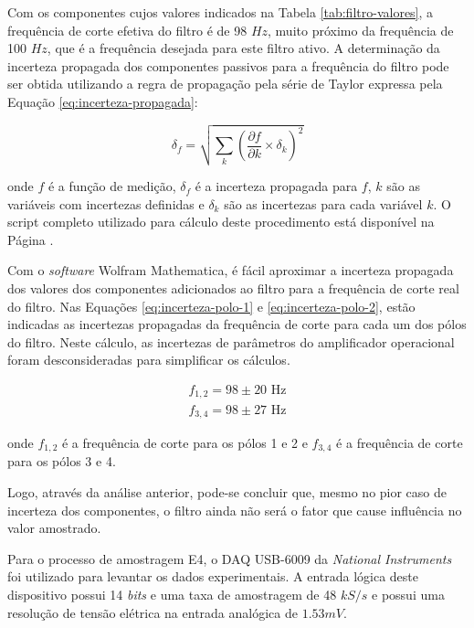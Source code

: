 \documentclass[a4paper]{instrumentacao}
\begin{document}
Com os componentes cujos valores indicados na Tabela \ref{tab:filtro-valores}, a frequência de corte efetiva do filtro é de 98 $Hz$, muito próximo da frequência de 100 $Hz$, que é a frequência desejada para este filtro ativo. A determinação da incerteza propagada dos componentes passivos para a frequência do filtro pode ser obtida utilizando a regra de propagação pela série de Taylor expressa pela Equação \ref{eq:incerteza-propagada}:

\begin{equation}
	\delta_f = \sqrt{
		\sum_{k} 
			\left(\frac{\partial f}{\partial k}\times \delta_k \right)^2
	}
	\label{eq:incerteza-propagada}
\end{equation}

\noindent
onde $f$ é a função de medição, $\delta_f$ é a incerteza propagada para $f$, $k$ são as variáveis com incertezas definidas e $\delta_k$ são as incertezas para cada variável $k$. O script completo utilizado para cálculo deste procedimento está disponível na Página \pageref{att:incerteza-filtro}.

Com o \textit{software} Wolfram Mathematica, é fácil aproximar a incerteza propagada dos valores dos componentes adicionados ao filtro para a frequência de corte real do filtro. Nas Equações \ref{eq:incerteza-polo-1} e \ref{eq:incerteza-polo-2}, estão indicadas as incertezas propagadas da frequência de corte para cada um dos pólos do filtro. Neste cálculo, as incertezas de parâmetros do amplificador operacional foram desconsideradas para simplificar os cálculos.

\begin{eqnarray}
	f_{1,2} = 98 \pm 20 \label{eq:incerteza-polo-1} \text{ Hz} \\
	f_{3,4} = 98 \pm 27 \label{eq:incerteza-polo-2} \text{ Hz} 
\end{eqnarray}

\noindent
onde $f_{1,2}$ é a frequência de corte para os pólos 1 e 2 e $f_{3,4}$ é a frequência de corte para os pólos 3 e 4.

Logo, através da análise anterior, pode-se concluir que, mesmo no pior caso de incerteza dos componentes, o filtro ainda não será o fator que cause influência no valor amostrado.

Para o processo de amostragem E4, o DAQ USB-6009 da \textit{National Instruments} foi utilizado para levantar os dados experimentais. A entrada lógica deste dispositivo possui 14 \textit{bits} e uma taxa de amostragem de 48 $kS/s$ e possui uma resolução de tensão elétrica na entrada analógica de $1.53 mV$.
\end{document}

